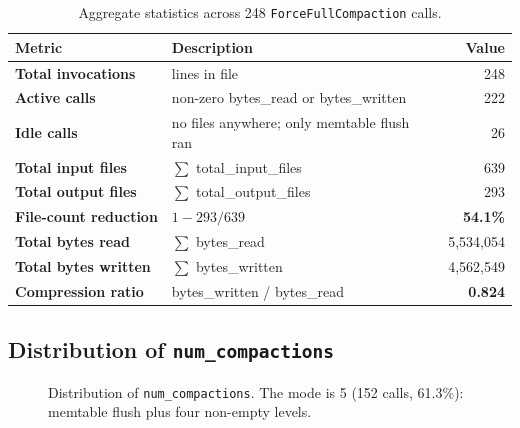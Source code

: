 \documentclass[11pt,a4paper]{article}
\newcommand{\sym}[1]{\texttt{#1}}
\begin{document}
\begin{table}[htbp]
\centering
\caption{Aggregate statistics across 248 \texttt{ForceFullCompaction} calls.}
\label{tab:agg}
\renewcommand{\arraystretch}{1.25}
\begin{tabularx}{\linewidth}{@{}>{\bfseries\color{primary!85!black}}lXr@{}}
\toprule
Metric & Description & Value \\
\midrule
Total invocations          & lines in file                                    & 248 \\
Active calls               & non-zero bytes\_read or bytes\_written           & 222 \\
Idle calls                 & no files anywhere; only memtable flush ran       & 26 \\
\addlinespace[2pt]
Total input files          & $\sum$ total\_input\_files                       & 639 \\
Total output files         & $\sum$ total\_output\_files                      & 293 \\
File-count reduction       & $1 - 293/639$                                    & \textbf{54.1\%} \\
\addlinespace[2pt]
Total bytes read           & $\sum$ bytes\_read                               & 5{,}534{,}054 \\
Total bytes written        & $\sum$ bytes\_written                            & 4{,}562{,}549 \\
Compression ratio          & bytes\_written / bytes\_read                     & \textbf{0.824} \\
\bottomrule
\end{tabularx}
\end{table}

\subsection{Distribution of \texttt{num\_compactions}}

\begin{figure}[htbp]
\centering
{}
\caption{Distribution of \sym{num\_compactions}. The mode is 5 (152 calls, 61.3\%): memtable flush plus four non-empty levels.}
\label{fig:hist}
\end{figure}
\end{document}
